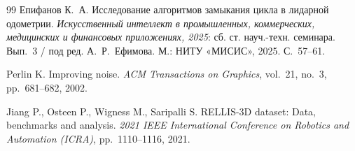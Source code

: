 \documentclass{misisarticle}
\begin{document}
\begin{thebibliography}{99}
 Епифанов К.~А. Исследование алгоритмов замыкания цикла в лидарной одометрии. \textit{Искусственный интеллект в промышленных, коммерческих, медицинских и финансовых приложениях, 2025}: сб. ст. науч.-техн. семинара. Вып.~3 / под ред. А.~Р.~Ефимова. М.: НИТУ «МИСИС», 2025. С.~57--61.

 Perlin K. Improving noise. \textit{ACM Transactions on Graphics}, vol.~21, no.~3, pp.~681--682, 2002.

 Jiang P., Osteen P., Wigness M., Saripalli S. RELLIS-3D dataset: Data, benchmarks and analysis. \textit{2021 IEEE International Conference on Robotics and Automation (ICRA)}, pp.~1110--1116, 2021.

\end{thebibliography}
\end{document}
